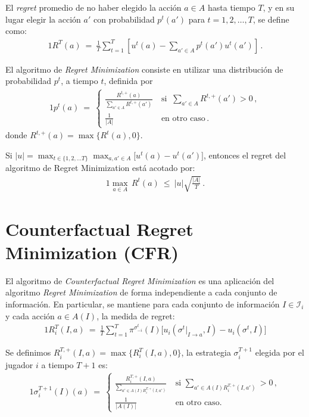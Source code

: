 \begin{definition}
\label{def:regret}
El \textit{regret} promedio de no haber elegido la acción $a \in A$ hasta tiempo $T$, y en su lugar elegir la acción $a'$ con probabilidad $p^t(a')$ para $t=1,2,\ldots,T$, se define como:
\begin{alignat}{1}
R^T(a)\ =\ \frac{1}{T} \sum_{t = 1}^T \left[u^t(a) - \sum_{a' \in A}p^t(a')u^t(a')\right] \,.
\end{alignat}
\end{definition}

El algoritmo de \textit{Regret Minimization} consiste en utilizar una distribución de probabilidad $p^t$, a tiempo $t$, definida por
\begin{alignat}{1}
p^t(a)\ =\ 
\begin{cases}
\frac{R^{t, +}(a)}{\sum_{a' \in A} R^{t, +}(a')}\ & \text{si }\ \sum_{a' \in A} R^{t, +}(a') > 0 \,, \\
\frac{1}{|A|}\ & \text{en otro caso} \,.
\end{cases}
\end{alignat}
donde $R^{t, +}(a) = \max\{R^t(a), 0\}$. 


\begin{theorem}[\textcolor{red}{\bf **** REF ****}]
Si $|u| = \max_{t \in \{1, 2, ... T\}} \max_{a, a' \in A}\bigl[u^t(a) - u^t(a')\bigr]$, entonces el regret del algoritmo de Regret Minimization está acotado por:
\begin{alignat}{1}
\max_{a \in A}\,R^t(a)\ \leq\ |u| \sqrt{\frac{|A|}{T}} \,.
\end{alignat}
\end{theorem}

\section{Counterfactual Regret Minimization (CFR)}
\label{section:cfr}

El algoritmo de \textit{Counterfactual Regret Minimization} es una aplicación del algoritmo \textit{Regret Minimization} de forma independiente a cada conjunto de información. En particular, se mantiene para cada conjunto de información $I \in \mathcal{I}_i$ y cada acción $a \in A(I)$, la medida de regret:
\begin{alignat}{1}
R_i^T(I, a)\ =\ \frac{1}{T} \sum_{t = 1}^T \pi^{\sigma^t_{-i}}(I)\biggl[u_i(\sigma^t|_{I \rightarrow a}, I) - u_i(\sigma^t, I)\biggr]
\end{alignat}

Se definimos $R_i^{T, +}(I, a) = \max\{R_i^T(I, a), 0\}$, la estrategia $\sigma^{T+1}_i$ elegida por el jugador $i$ a tiempo $T+1$ es:
\begin{alignat}{1}
\label{eq:cfr-regret-matching}
\sigma_i^{T+1}(I)(a)\ =\
\begin{cases}
\frac{R_i^{T, +}(I, a)}{\sum_{a' \in A(I) R_i^{T, +}(I, a')}}\ & \text{si } \sum_{a' \in A(I) R_i^{T, +}(I, a')} > 0 \,, \\
\frac{1}{|A(I)|}\ & \text{en otro caso.} 
\end{cases}
\end{alignat}

